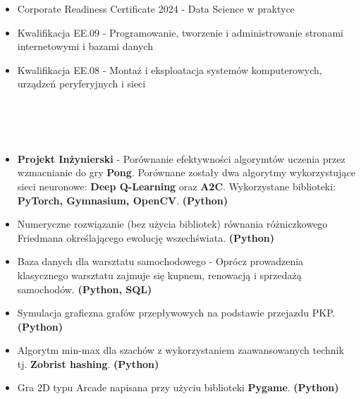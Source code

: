 \documentclass[10pt]{article}
\begin{document}
\begin{paracol}{2}
\begin{rightcolumn}
\begin{itemize}[leftmargin=*]
        \item Corporate Readiness Certificate 2024 - Data Science w praktyce
        \item Kwalifikacja EE.09 - Programowanie, tworzenie i administrowanie stronami
        internetowymi i bazami danych
        \item Kwalifikacja EE.08 - Montaż i eksploatacja systemów komputerowych, urządzeń
        peryferyjnych i sieci
    \end{itemize}
    \rule{0pt}{0pt} \\ \\ \\
    \fontsize{10pt}{10pt}
    \begin{itemize}[leftmargin=*]
        \setlength{\parskip}{0pt}
        \item \textbf{Projekt Inżynierski} - Porównanie efektywności algorymtów uczenia przez wzmacnianie do gry \textbf{Pong}.
        Porównane zostały dwa algorytmy wykorzystujące sieci neuronowe: \textbf{Deep Q-Learning} oraz \textbf{A2C}. 
        Wykorzystane biblioteki: \textbf{PyTorch, Gymnasium, OpenCV}. \textbf{(Python)}
        \item Numeryczne rozwiązanie (bez użycia bibliotek) równania różniczkowego Friedmana określającego ewolucję wszechświata. \textbf{(Python)}
        \item Baza danych dla warsztatu samochodowego - Oprócz prowadzenia klasycznego warsztatu zajmuje się kupnem, renowacją i sprzedażą samochodów. \textbf{(Python, SQL)}
        \item Symulacja graficzna grafów przepływowych na podstawie przejazdu PKP. \textbf{(Python)}
        \item Algorytm min-max dla szachów z wykorzystaniem zaawansowanych technik tj. \textbf{Zobrist hashing}. \textbf{(Python)}
        \item Gra 2D typu Arcade napisana przy użyciu biblioteki \textbf{Pygame}. \textbf{(Python)}
    \end{itemize}

\end{rightcolumn}
\end{paracol}
\end{document}
